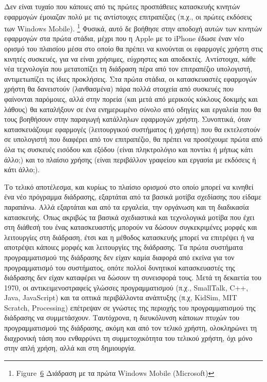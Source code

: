 \documentclass[
]{article}
\begin{document}
Δεν είναι τυχαίο που κάποιες από τις πρώτες προσπάθειες κατασκευής
κινητών εφαρμογών έμοιαζαν πολύ με τις αντίστοιχες επιτραπέζιες (π.χ.,
οι πρώτες εκδόσεις των Windows Mobile). \footnote{Figure~\protect\hyperlink{fig:windows-mobile}{6}
  Διάδραση με τα πρώτα Windows Mobile (Microsoft)} Φυσικά, αυτό δε
βοήθησε στην αποδοχή αυτών των κινητών εφαρμογών στα πρώτα στάδια, μέχρι
που η Apple με το iPhone έδωσε έναν νέο ορισμό του πλαισίου μέσα στο
οποίο θα πρέπει να κινούνται οι εφαρμογές χρήστη στις κινητές συσκευές,
για να είναι χρήσιμες, εύχρηστες και αποδεκτές. Αντίστοιχα, κάθε νέα
τεχνολογία που μετατοπίζει τη διάδραση πέρα από τον επιτραπέζιο
υπολογιστή, αντιμετωπίζει τις ίδιες προκλήσεις. Στα πρώτα στάδια, οι
κατασκευαστές εφαρμογών χρήστη θα δανειστούν (λανθασμένα) πάρα πολλά
στοιχεία από συσκευές που φαίνονται παρόμοιες, αλλά στην πορεία (και
μετά από μερικούς κύκλους δοκιμής και λάθους) θα καταλήξουν σε ένα
ενημερωμένο σύνολο από οδηγίες και εργαλεία που θα τους βοηθήσουν στην
παραγωγή κατάλληλων εφαρμογών χρήστη. Συνοπτικά, όταν κατασκευάζουμε
εφαρμογές (λειτουργικού συστήματος ή χρήστη) που θα εκτελεστούν σε
υπολογιστή που διαφέρει από τον επιτραπέζιο, θα πρέπει να προσέχουμε
πρώτα από όλα τις συσκευές εισόδου και εξόδου (είναι πληκτρολόγιο και
ποντίκι ή μήπως κάτι άλλο;) και το πλαίσιο χρήσης (είναι περιβάλλον
γραφείου και εργασία με εκδόσεις ή κάτι άλλο;).

Το τελικό αποτέλεσμα, και κυρίως το πλαίσιο ορισμού στο οποίο μπορεί να
κινηθεί ένα νέο πρόγραμμα διάδρασης, εξαρτάται από τα βασικά μοτίβα
σχεδίασης που είδαμε παραπάνω. Αλλά εξαρτάται και από τα εργαλεία, την
οργάνωση και τη διαδικασία κατασκευής. Όπως ακριβώς τα βασικά
σχεδιαστικά και τεχνολογικά μοτίβα που έχει στη διάθεσή του ένας
κατασκευαστής μπορούν να δώσουν συγκεκριμένες μορφές και λειτουργίες στη
διάδραση, έτσι και η μέθοδος κατασκευής μπορεί να επιτρέψει ή να
αποτρέψει κάποιες μορφές και λειτουργίες της διάδρασης. Τα πρώτα
συστήματα προγραμματισμού της διάδρασης δεν είχαν καμία διαφορά από
εκείνα για τον προγραμματισμό του συστήματος, οπότε πολλοί δυνητικοί
κατασκευαστές της διάδρασης δεν είχαν καταφέρει να δώσουν τη συνεισφορά
τους. Μετά τη δεκαετία του 1970, οι αντικειμενοστραφείς γλώσσες
προγραμματισμού (π.χ., SmallTalk, C++, Java, JavaScript) και τα οπτικά
περιβάλλοντα ανάπτυξης (π.χ, KidSim, MIT Scratch, Processing) επέτρεψαν
σε γνώστες της περιοχής του προγραμματισμού της διάδρασης να
συμμετάσχουν. Ταυτόχρονα, η διευκόλυνση κάποιων πτυχών του
προγραμματισμού της διάδρασης, ακόμη και από τον τελικό χρήστη,
ολοκληρώνει τη διαχρονική τάση που ενθαρρύνει τη συμμετοχικότητα του
τελικού χρήστη, όχι μόνο στην απλή χρήση, αλλά και στη δημιουργία.
\end{document}
